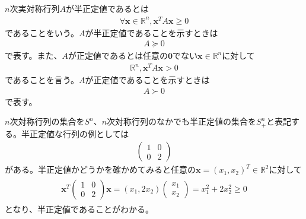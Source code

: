 $n$次実対称行列$A$が半正定値であるとは
\begin{align} \label{PSD}
  \forall \mathbf{x} \in \mathbb{R}^n, \mathbf{x}^T A \mathbf{x} \geq 0
\end{align}
であることをいう。$A$が半正定値であることを示すときは
\begin{align*}
  A \succeq 0
\end{align*}
で表す。また、$A$が正定値であるとは任意の$\mathbf{0}$でない$\mathbf{x} \in \mathbb{R}^n$に対して
\begin{align} \label{PD}
  \mathbb{R}^n, \mathbf{x}^T A \mathbf{x} > 0
\end{align}
であることを言う。$A$が正定値であることを示すときは
\begin{align*}
  A \succ 0
\end{align*}
で表す。

$n$次対称行列の集合を$S^n$、$n$次対称行列のなかでも半正定値の集合を$S_+^n$と表記する。半正定値な行列の例としては
\begin{align*}
  \left(
    \begin{array}{cc}
      1 & 0 \\
      0 & 2
    \end{array}
  \right)
\end{align*}
がある。半正定値かどうかを確かめてみると任意の$\mathbf{x} = \left(x_1, x_2\right)^T \in \mathbb{R}^2$に対して
\begin{align*}
  \begin{array}{cc}
         \mathbf{x}^T
           \left(
             \begin{array}{cc}
               1 & 0 \\
               0 & 2
             \end{array}
           \right)
         \mathbf{x}
    =    \left(x_1, 2x_2\right)
           \left(
             \begin{array}{c}
               x_1 \\
               x_2
             \end{array}
           \right)
    =    x_1^2 + 2 x_2^2
    \geq 0
  \end{array}
\end{align*}
となり、半正定値であることがわかる。

